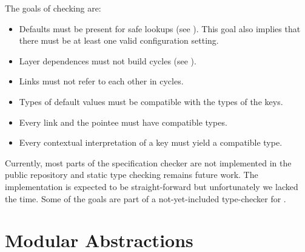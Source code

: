 The goals of checking  are:

\begin{itemize}
\item Defaults must be present for safe lookups (see ).
This goal also implies that there must be at least one valid configuration setting.
\item Layer dependences must not build cycles (see ).
\item Links must not refer to each other in cycles.
\item Types of default values must be compatible with the types of the keys.
\item Every link and the pointee must have compatible types.
\item Every contextual interpretation of a key must yield a compatible type.
\end{itemize}

Currently, most parts of the specification checker are not implemented in the public repository and static type checking remains future work.
The implementation is expected to be straight-forward but unfortunately we lacked the time.
Some of the goals are part of a not-yet-included type-checker for .


















































\section{Modular Abstractions}
\label{sec:modular-abstractions}


